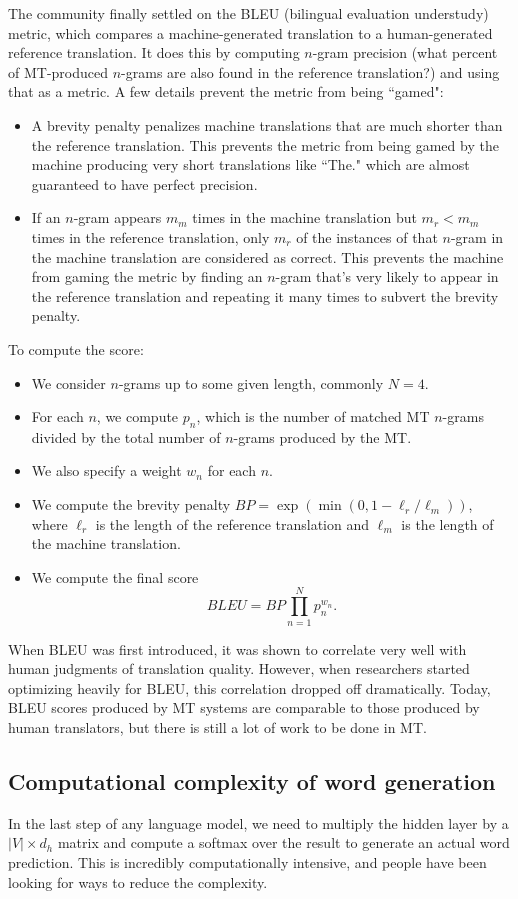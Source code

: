 The community finally settled on the BLEU (bilingual evaluation understudy) metric, which compares a machine-generated translation to a human-generated reference translation. It does this by computing $n$-gram precision (what percent of MT-produced $n$-grams are also found in the reference translation?) and using that as a metric. A few details prevent the metric from being ``gamed": 
\begin{itemize}
\item A brevity penalty penalizes machine translations that are much shorter than the reference translation. This prevents the metric from being gamed by the machine producing very short translations like ``The." which are almost guaranteed to have perfect precision.
\item If an $n$-gram appears $m_m$ times in the machine translation but $m_r < m_m$ times in the reference translation, only $m_r$ of the instances of that $n$-gram in the machine translation are considered as correct. This prevents the machine from gaming the metric by finding an $n$-gram that's very likely to appear in the reference translation and repeating it many times to subvert the brevity penalty.
\end{itemize}
To compute the score:
\begin{itemize}
\item We consider $n$-grams up to some given length, commonly $N = 4$.
\item For each $n$, we compute $p_n$, which is the number of matched MT $n$-grams divided by the total number of $n$-grams produced by the MT.
\item We also specify a weight $w_n$ for each $n$.
\item We compute the brevity penalty $BP = \exp \left(\min \left(0, 1 - \ell_r / \ell_m\right)\right)$, where $\ell_r$ is the length of the reference translation and $\ell_m$ is the length of the machine translation.
\item We compute the final score
$$BLEU = BP \prod_{n=1}^N p_n^{w_n}.$$
\end{itemize}
When BLEU was first introduced, it was shown to correlate very well with human judgments of translation quality. However, when researchers started optimizing heavily for BLEU, this correlation dropped off dramatically. Today, BLEU scores produced by MT systems are comparable to those produced by human translators, but there is still a lot of work to be done in MT.

\subsection{Computational complexity of word generation}
In the last step of any language model, we need to multiply the hidden layer by a $|V| \times d_h$ matrix and compute a softmax over the result to generate an actual word prediction. This is incredibly computationally intensive, and people have been looking for ways to reduce the complexity. 

